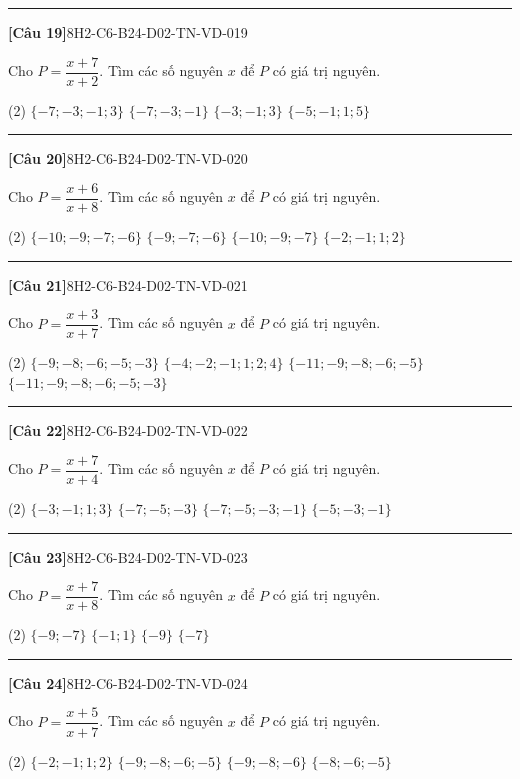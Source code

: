 \documentclass[12pt,a4paper]{article}
\newif\ifloigiai
\newenvironment{cauhoi}[2]{%
  \par\medskip\noindent\rule{\textwidth}{0.4pt}\par\nopagebreak
  \noindent\textbf{[#1]}\hfill{\scriptsize\ttfamily #2}\par\nopagebreak\smallskip}{\par}
\newcommand{\dapan}[1]{\ifloigiai\par\smallskip\noindent\textit{Đáp án:} \textbf{#1}\par\fi}
\begin{document}
\begin{cauhoi}{Câu 19}{8H2-C6-B24-D02-TN-VD-019}
Cho $P=\dfrac{x+7}{x+2}$. Tìm các số nguyên $x$ để $P$ có giá trị nguyên.
\begin{tasks}(2)
\task $\{-7; -3; -1; 3\}$
\task $\{-7; -3; -1\}$
\task $\{-3; -1; 3\}$
\task $\{-5; -1; 1; 5\}$
\end{tasks}
\dapan{A}
\end{cauhoi}
\begin{cauhoi}{Câu 20}{8H2-C6-B24-D02-TN-VD-020}
Cho $P=\dfrac{x+6}{x+8}$. Tìm các số nguyên $x$ để $P$ có giá trị nguyên.
\begin{tasks}(2)
\task $\{-10; -9; -7; -6\}$
\task $\{-9; -7; -6\}$
\task $\{-10; -9; -7\}$
\task $\{-2; -1; 1; 2\}$
\end{tasks}
\dapan{A}
\end{cauhoi}
\begin{cauhoi}{Câu 21}{8H2-C6-B24-D02-TN-VD-021}
Cho $P=\dfrac{x+3}{x+7}$. Tìm các số nguyên $x$ để $P$ có giá trị nguyên.
\begin{tasks}(2)
\task $\{-9; -8; -6; -5; -3\}$
\task $\{-4; -2; -1; 1; 2; 4\}$
\task $\{-11; -9; -8; -6; -5\}$
\task $\{-11; -9; -8; -6; -5; -3\}$
\end{tasks}
\dapan{D}
\end{cauhoi}
\begin{cauhoi}{Câu 22}{8H2-C6-B24-D02-TN-VD-022}
Cho $P=\dfrac{x+7}{x+4}$. Tìm các số nguyên $x$ để $P$ có giá trị nguyên.
\begin{tasks}(2)
\task $\{-3; -1; 1; 3\}$
\task $\{-7; -5; -3\}$
\task $\{-7; -5; -3; -1\}$
\task $\{-5; -3; -1\}$
\end{tasks}
\dapan{C}
\end{cauhoi}
\begin{cauhoi}{Câu 23}{8H2-C6-B24-D02-TN-VD-023}
Cho $P=\dfrac{x+7}{x+8}$. Tìm các số nguyên $x$ để $P$ có giá trị nguyên.
\begin{tasks}(2)
\task $\{-9; -7\}$
\task $\{-1; 1\}$
\task $\{-9\}$
\task $\{-7\}$
\end{tasks}
\dapan{A}
\end{cauhoi}
\begin{cauhoi}{Câu 24}{8H2-C6-B24-D02-TN-VD-024}
Cho $P=\dfrac{x+5}{x+7}$. Tìm các số nguyên $x$ để $P$ có giá trị nguyên.
\begin{tasks}(2)
\task $\{-2; -1; 1; 2\}$
\task $\{-9; -8; -6; -5\}$
\task $\{-9; -8; -6\}$
\task $\{-8; -6; -5\}$
\end{tasks}
\dapan{B}
\end{cauhoi}
\end{document}
